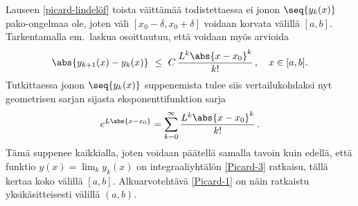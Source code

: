Lauseen \ref{picard-lindelöf} toista väittämää todistettaessa ei jonon $\seq{y_k(x)}$ 
pako-ongelmaa ole, joten väli $[x_0-\delta,x_0+\delta]$ voidaan korvata välillä $[a,b]$.
Tarkentamalla em.\ laskua osoittautuu, että voidaan myös arvioida
\[
\abs{y_{k+1}(x)-y_k(x)}\ \le\ C\,\frac{L^k\abs{x-x_0}^k}{k!}\,, \quad x\in[a,b].
\]
Tutkittaessa jonon $\seq{y_k(x)}$ suppenemista tulee siis vertailukohdaksi nyt geometrisen
sarjan sijasta eksponenttifunktion sarja
\[ 
e^{L\abs{x-x_0}} = \sum_{k=0}^\infty \frac{L^k\abs{x-x_0}^k}{k!}\,. 
\]
Tämä suppenee kaikkialla, joten voidaan päätellä samalla tavoin kuin edellä, että funktio
$y(x)=\lim_k y_k(x)$ on integraaliyhtälön \eqref{Picard-3} ratkaisu, tällä kertaa koko välillä
 $[a,b]$. Alkuarvotehtävä \eqref{Picard-1} on näin ratkaistu yksikäsitteisesti välillä $(a,b)$.
 

